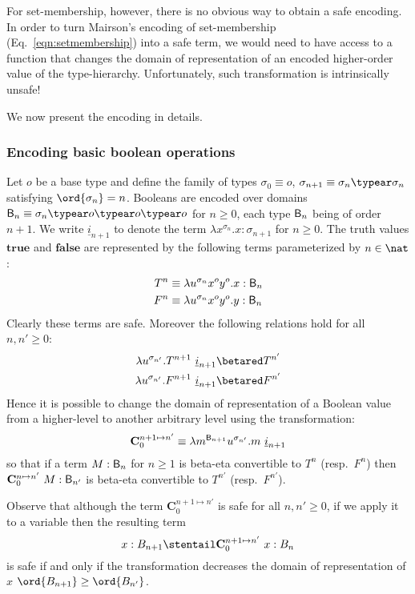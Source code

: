For set-membership, however, there is no obvious way to obtain a safe encoding. In order to turn Mairson's encoding of set-membership (Eq.\ \ref{eqn:setmembership}) into a safe term, we would need to have access to a function that changes the domain of representation of an encoded higher-order value of the type-hierarchy. Unfortunately, such transformation is intrinsically unsafe!
\smallskip

We now present the encoding in details.

\subsubsection{Encoding basic boolean operations}

Let $o$ be a base type and define the family of types $\sigma_0
\equiv o$, $\sigma_{n+1} \equiv \sigma_n\typear\sigma_n$ satisfying
$\ord{\sigma_n} = n$. Booleans are encoded over domains $\booltype_n
\equiv \sigma_n\typear o\typear o\typear o$ for $n\geq0$, each type
$\mathsf{B}_n$ being of order $n+1$. We write $\underline{i}_{n+1}$
to denote the term $\lambda x^{\sigma_n}.x : \sigma_{n+1}$ for
$n\geq0$. The truth values $\mathbf{true}$ and $\mathbf{false}$ are
represented by the following terms parameterized by $n \in \nat$:
\begin{align*}
  T^n &\equiv \lambda u^{\sigma_n} x^o y^o .x : \mathsf{B}_{n}\\
  F^n &\equiv \lambda u^{\sigma_n} x^o y^o .y : \mathsf{B}_{n}
\end{align*}
Clearly these terms are safe. Moreover the following relations hold
for all $n,n'\geq 0$:
\begin{align*}
  \lambda u^{\sigma_{n'}} . T^{n+1}~\underline{i}_{n+1}  &\betared  T^{n'} \\
  \lambda u^{\sigma_{n'}} . F^{n+1}~\underline{i}_{n+1}  &\betared  F^{n'}
\end{align*}
Hence it is possible to change the domain of representation of a Boolean value from a higher-level to another arbitrary level using the transformation:
$$ \mathbf{C}^{n+1\mapsto n'}_0 \equiv \lambda m^{\mathsf{B}_{n+1}} u^{\sigma_{n'}}. m~\underline{i}_{n+1}$$
so that if a term $M : \mathsf{B}_n$ for $n\geq1$ is beta-eta convertible to $T^n$ (resp.\ $F^n$) then $\mathbf{C}^{n\mapsto n'}_0~M :\mathsf{B}_{n'}$ is beta-eta convertible to $T^{n'}$ (resp.\ $F^{n'}$).

Observe that although the term $\mathbf{C}^{n+1\mapsto n'}_0$ is safe for all $n,n'\geq 0$, if we apply it to a variable then the resulting term
$$ x:B_{n+1} \stentail \mathbf{C}_0^{n+1\mapsto n'}~x : B_{n}$$
is safe if and only if the transformation decreases the domain of representation of $x$ \ie $\ord{B_{n+1}}\geq\ord{B_{n'}}$.


